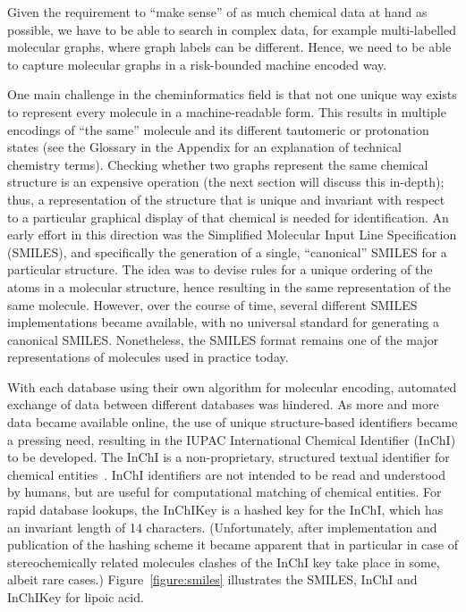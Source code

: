 \documentclass{sig-alternate}
\begin{document}
Given the requirement to ``make sense'' of as much chemical data at hand as possible, we have to be able to search in
complex data, for example multi-labelled molecular graphs, where graph labels can be different. Hence, we need to be
able to capture molecular graphs in a risk-bounded machine encoded way.

One main challenge in the cheminformatics field is that not one unique way exists to represent every molecule in a
machine-readable form. This results in multiple encodings of
``the same'' molecule and its different tautomeric or protonation states (see the Glossary in the Appendix for an explanation of technical chemistry terms). Checking whether two graphs represent the same chemical structure is
an expensive operation (the next section will discuss this in-depth);
thus, a representation of the structure that is unique and invariant
with respect to a particular graphical display of that chemical is needed for
identification. An early effort in this direction was the Simplified
Molecular Input Line Specification (SMILES), and specifically the
generation of a single, ``canonical'' SMILES for a particular structure. The idea was to devise rules for a unique
ordering of the atoms in a molecular structure, hence resulting in the same representation of the same molecule.
However,
over the course of time, several
different SMILES implementations became available, with no universal
standard for generating a canonical SMILES. Nonetheless, the SMILES format remains one of the major representations of
molecules used in practice today.

With each database using their own algorithm for molecular encoding,
automated exchange of data between different databases was hindered.
As more and more data became available online, the use of unique
structure-based identifiers became a pressing need, resulting in the IUPAC
International Chemical Identifier (InChI) to be developed. The
InChI is a non-proprietary, structured textual identifier for chemical
entities~\cite{inchi}. InChI identifiers are not intended to be read and
understood by humans, but are useful for computational matching of
chemical entities. For rapid database lookups, the InChIKey is a
hashed key for the InChI, which has an invariant length of 14
characters. (Unfortunately, after implementation and publication of the hashing scheme it became apparent that in
particular in case of stereochemically related molecules clashes of the InChI key take place in some, albeit rare
cases.) Figure~\ref{figure:smiles} illustrates the SMILES, InChI and InChIKey for
lipoic acid.
\end{document}
